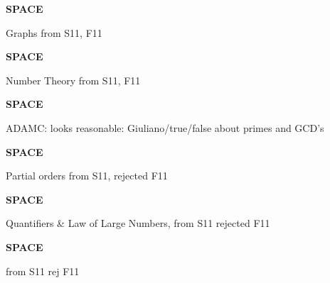 \documentclass[quiz]{mcs}
\renewcommand{\examspace}{\textbf{SPACE}\newline}
\begin{document}
\conflictfinalone


\examspace  

\begin{editingnotes}Graphs from S11, F11\end{editingnotes}


\examspace 
\begin{editingnotes}Number Theory  from S11, F11 \end{editingnotes}


\examspace 
\begin{editingnotes}
ADAMC: looks reasonable: Giuliano/true/false about primes and GCD's
\end{editingnotes}

\examspace 
\begin{editingnotes}Partial orders from S11, rejected F11\end{editingnotes}


\examspace  
\begin{editingnotes}Quantifiers \& Law of Large Numbers, from S11 rejected F11\end{editingnotes}


\examspace
\begin{editingnotes} from S11 rej F11\end{editingnotes}


\iffalse
\examspace
\begin{editingnotes}rej F11\end{editingnotes}
\pinput[points=6, title =
  \textbf{4 and 7 cent stamps by induction}]{FP_4_and_7_cent_stamps_by_induction}

\examspace
\begin{editingnotes}F11\end{editingnotes}
\pinput[points = 9, title=
  \textbf{structural induction lF18 composition}]
       {FP_structural_induction_lF18_composition}
\fi
\end{document}
